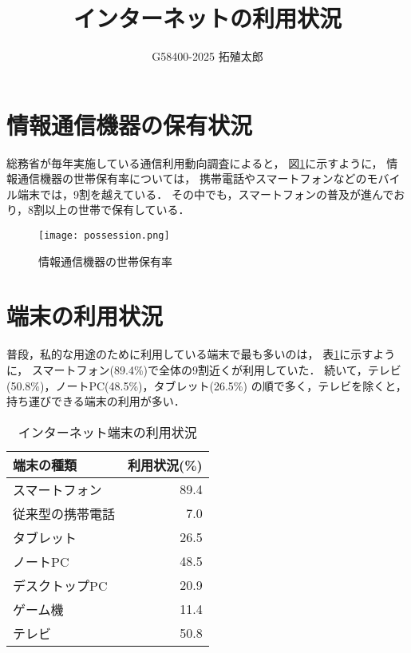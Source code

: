 \documentclass[a4paper,11pt,dvipdfmx]{ujarticle}
\title{インターネットの利用状況}
\author{G58400-2025 拓殖太郎}
\begin{document}
\maketitle

\section{情報通信機器の保有状況}

総務省が毎年実施している通信利用動向調査\cite{soumu}によると，
図\ref{fig:保有率}に示すように，
情報通信機器の世帯保有率については，
携帯電話やスマートフォンなどのモバイル端末では，9割を越えている．
その中でも，スマートフォンの普及が進んでおり，8割以上の世帯で保有している．

\begin{figure}[htbp]
    \centering
    \texttt{[image: possession.png]}
    \caption{情報通信機器の世帯保有率}\label{fig:保有率}
\end{figure}

\section{端末の利用状況}

普段，私的な用途のために利用している端末で最も多いのは，
表\ref{tbl:利用状況}に示すように，
スマートフォン(89.4\%)で全体の9割近くが利用していた．
続いて，テレビ(50.8\%)，ノートPC(48.5\%)，タブレット(26.5\%)
の順で多く，テレビを除くと，持ち運びできる端末の利用が多い\cite{corona}．

\begin{table}[htbp]
    \centering
    \caption{インターネット端末の利用状況}
    \label{tbl:利用状況}

    \begin{tabular}{|l|r|}\hline
        端末の種類 & 利用状況(\%) \\
        \hline
        スマートフォン & 89.4 \\
        \hline
        従来型の携帯電話 & 7.0 \\
        \hline
        タブレット & 26.5 \\
        \hline
        ノートPC & 48.5 \\
        \hline
        デスクトップPC & 20.9 \\
        \hline
        ゲーム機 & 11.4 \\
        \hline 
        テレビ & 50.8 \\
        \hline
    \end{tabular}
\end{table}
\end{document}
